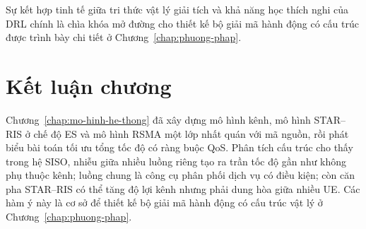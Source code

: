 Sự kết hợp tinh tế giữa tri thức vật lý giải tích và khả năng học thích nghi của DRL chính là chìa khóa mở
đường cho thiết kế bộ giải mã hành động có cấu trúc được trình bày chi tiết ở Chương~\ref{chap:phuong-phap}.

\section{Kết luận chương}
\label{sec:ch2-ket-luan}

Chương~\ref{chap:mo-hinh-he-thong} đã xây dựng mô hình kênh, mô hình STAR--RIS ở chế độ ES và mô hình RSMA
một lớp nhất quán với mã nguồn, rồi phát biểu bài toán tối ưu tổng tốc độ có ràng buộc QoS. Phân tích cấu trúc
cho thấy trong hệ SISO, nhiễu giữa nhiều luồng riêng tạo ra trần tốc độ gần như không phụ thuộc kênh; luồng
chung là công cụ phân phối dịch vụ có điều kiện; còn căn pha STAR--RIS có thể tăng độ lợi kênh nhưng phải dung
hòa giữa nhiều UE. Các hàm ý này là cơ sở để thiết kế bộ giải mã hành động có cấu trúc vật lý ở
Chương~\ref{chap:phuong-phap}.
